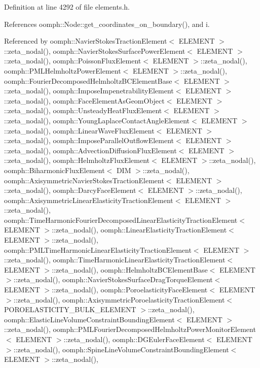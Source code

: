 Definition at line 4292 of file elements.\+h.



References oomph\+::\+Node\+::get\+\_\+coordinates\+\_\+on\+\_\+boundary(), and i.



Referenced by oomph\+::\+Navier\+Stokes\+Traction\+Element$<$ E\+L\+E\+M\+E\+N\+T $>$\+::zeta\+\_\+nodal(), oomph\+::\+Navier\+Stokes\+Surface\+Power\+Element$<$ E\+L\+E\+M\+E\+N\+T $>$\+::zeta\+\_\+nodal(), oomph\+::\+Poisson\+Flux\+Element$<$ E\+L\+E\+M\+E\+N\+T $>$\+::zeta\+\_\+nodal(), oomph\+::\+P\+M\+L\+Helmholtz\+Power\+Element$<$ E\+L\+E\+M\+E\+N\+T $>$\+::zeta\+\_\+nodal(), oomph\+::\+Fourier\+Decomposed\+Helmholtz\+B\+C\+Element\+Base$<$ E\+L\+E\+M\+E\+N\+T $>$\+::zeta\+\_\+nodal(), oomph\+::\+Impose\+Impenetrability\+Element$<$ E\+L\+E\+M\+E\+N\+T $>$\+::zeta\+\_\+nodal(), oomph\+::\+Face\+Element\+As\+Geom\+Object$<$ E\+L\+E\+M\+E\+N\+T $>$\+::zeta\+\_\+nodal(), oomph\+::\+Unsteady\+Heat\+Flux\+Element$<$ E\+L\+E\+M\+E\+N\+T $>$\+::zeta\+\_\+nodal(), oomph\+::\+Young\+Laplace\+Contact\+Angle\+Element$<$ E\+L\+E\+M\+E\+N\+T $>$\+::zeta\+\_\+nodal(), oomph\+::\+Linear\+Wave\+Flux\+Element$<$ E\+L\+E\+M\+E\+N\+T $>$\+::zeta\+\_\+nodal(), oomph\+::\+Impose\+Parallel\+Outflow\+Element$<$ E\+L\+E\+M\+E\+N\+T $>$\+::zeta\+\_\+nodal(), oomph\+::\+Advection\+Diffusion\+Flux\+Element$<$ E\+L\+E\+M\+E\+N\+T $>$\+::zeta\+\_\+nodal(), oomph\+::\+Helmholtz\+Flux\+Element$<$ E\+L\+E\+M\+E\+N\+T $>$\+::zeta\+\_\+nodal(), oomph\+::\+Biharmonic\+Flux\+Element$<$ D\+I\+M $>$\+::zeta\+\_\+nodal(), oomph\+::\+Axisymmetric\+Navier\+Stokes\+Traction\+Element$<$ E\+L\+E\+M\+E\+N\+T $>$\+::zeta\+\_\+nodal(), oomph\+::\+Darcy\+Face\+Element$<$ E\+L\+E\+M\+E\+N\+T $>$\+::zeta\+\_\+nodal(), oomph\+::\+Axisymmetric\+Linear\+Elasticity\+Traction\+Element$<$ E\+L\+E\+M\+E\+N\+T $>$\+::zeta\+\_\+nodal(), oomph\+::\+Time\+Harmonic\+Fourier\+Decomposed\+Linear\+Elasticity\+Traction\+Element$<$ E\+L\+E\+M\+E\+N\+T $>$\+::zeta\+\_\+nodal(), oomph\+::\+Linear\+Elasticity\+Traction\+Element$<$ E\+L\+E\+M\+E\+N\+T $>$\+::zeta\+\_\+nodal(), oomph\+::\+P\+M\+L\+Time\+Harmonic\+Linear\+Elasticity\+Traction\+Element$<$ E\+L\+E\+M\+E\+N\+T $>$\+::zeta\+\_\+nodal(), oomph\+::\+Time\+Harmonic\+Linear\+Elasticity\+Traction\+Element$<$ E\+L\+E\+M\+E\+N\+T $>$\+::zeta\+\_\+nodal(), oomph\+::\+Helmholtz\+B\+C\+Element\+Base$<$ E\+L\+E\+M\+E\+N\+T $>$\+::zeta\+\_\+nodal(), oomph\+::\+Navier\+Stokes\+Surface\+Drag\+Torque\+Element$<$ E\+L\+E\+M\+E\+N\+T $>$\+::zeta\+\_\+nodal(), oomph\+::\+Poroelasticity\+Face\+Element$<$ E\+L\+E\+M\+E\+N\+T $>$\+::zeta\+\_\+nodal(), oomph\+::\+Axisymmetric\+Poroelasticity\+Traction\+Element$<$ P\+O\+R\+O\+E\+L\+A\+S\+T\+I\+C\+I\+T\+Y\+\_\+\+B\+U\+L\+K\+\_\+\+E\+L\+E\+M\+E\+N\+T $>$\+::zeta\+\_\+nodal(), oomph\+::\+Elastic\+Line\+Volume\+Constraint\+Bounding\+Element$<$ E\+L\+E\+M\+E\+N\+T $>$\+::zeta\+\_\+nodal(), oomph\+::\+P\+M\+L\+Fourier\+Decomposed\+Helmholtz\+Power\+Monitor\+Element$<$ E\+L\+E\+M\+E\+N\+T $>$\+::zeta\+\_\+nodal(), oomph\+::\+D\+G\+Euler\+Face\+Element$<$ E\+L\+E\+M\+E\+N\+T $>$\+::zeta\+\_\+nodal(), oomph\+::\+Spine\+Line\+Volume\+Constraint\+Bounding\+Element$<$ E\+L\+E\+M\+E\+N\+T $>$\+::zeta\+\_\+nodal(), 